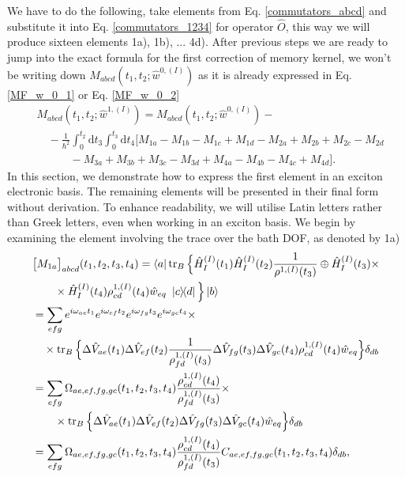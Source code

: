 We have to do the following, take elements from Eq. \ref{commutators_abcd} and substitute it into Eq. \ref{commutators_1234} for operator $\hat{O}$, this way we will produce sixteen elements 1a), 1b), ... 4d). After previous steps we are ready to jump into the exact formula for the first correction of memory kernel, we won't be writing down $M_{abcd}(t_1, t_2; \hat{w}^{0,(I)})$ as it is already expressed in Eq. \ref{MF_w_0_1} or Eq. \ref{MF_w_0_2}
\begin{equation}
\label{corrected_memory_kernel_decomposition}
    \begin{aligned}
    &M_{abcd}(t_1, t_2; \hat{w}^{1,(I)}) = M_{abcd}(t_1, t_2; \hat{w}^{0,(I)}) - \\
    &\quad -\frac{1}{\hbar^2} \int_{0}^{t_2} \mathrm{d} t_3 \int_{0}^{t_3} \mathrm{d} t_4 \Big[ M_{1a} - M_{1b} - M_{1c} + M_{1d} - M_{2a} + M_{2b} + M_{2c} - M_{2d}\\
    & \quad \quad \quad - M_{3a} + M_{3b} + M_{3c} - M_{3d} + M_{4a} - M_{4b} - M_{4c} + M_{4d}\Big].
    \end{aligned}
\end{equation}
In this section, we demonstrate how to express the first element in an exciton electronic basis. The remaining elements will be presented in their final form without derivation. To enhance readability, we will utilise Latin letters rather than Greek letters, even when working in an exciton basis. We begin by examining the element involving the trace over the bath DOF, as denoted by 1a)
\begin{equation}
\label{m_1a_rewriting_1}
    \begin{aligned}
    &\big[M_{1a}\big]_{abcd}(t_1, t_2, t_3, t_4) = \bra{a}\operatorname{tr}_B \Big\{ \hat{H}_{I}^{(I)}(t_1) \hat{H}_{I}^{(I)}(t_2) \frac{1}{\rho^{1, (I)}(t_3)} \oplus \hat{H}_{I}^{(I)}(t_3) \times \\
    & \quad \quad  \times\hat{H}_{I}^{(I)}(t_4) \rho^{1, (I)}_{cd}(t_4)\hat{w}_{eq}\ \ketbra{c}{d}\Big\} \ket{b}  \\
    & = \sum_{efg} e^{i \omega_{ae}t_1} e^{i \omega_{ef}t_2} e^{i \omega_{fg}t_3} e^{i \omega_{gc}t_4} \times \\ 
    & \quad \times \operatorname{tr}_B \Big\{ \Delta\hat{V}_{ae}(t_1) \Delta\hat{V}_{ef}(t_2) \frac{1}{\rho^{1, (I)}_{fd}(t_3)} \Delta\hat{V}_{fg}(t_3) \Delta\hat{V}_{gc}(t_4) \rho^{1, (I)}_{cd}(t_4) \hat{w}_{eq} \Big\}  \delta_{db}\\
    & = \sum_{efg} \Omega_{ae,ef,fg,gc}(t_1,t_2,t_3,t_4)\frac{\rho^{1, (I)}_{cd}(t_4)}{\rho^{1, (I)}_{fd}(t_3)} \times \\ 
    & \quad \quad \times \operatorname{tr}_B \Big\{ \Delta\hat{V}_{ae}(t_1) \Delta\hat{V}_{ef}(t_2) \Delta\hat{V}_{fg}(t_3) \Delta\hat{V}_{gc}(t_4)  \hat{w}_{eq}\Big\} \delta_{db}\\
    & = \sum_{efg} \Omega_{ae,ef,fg,gc}(t_1,t_2,t_3,t_4)\frac{\rho^{1, (I)}_{cd}(t_4)}{\rho^{1, (I)}_{fd}(t_3)}  C_{ae,ef,fg,gc}(t_1, t_2, t_3, t_4) \delta_{db},
    \end{aligned} 
\end{equation}
